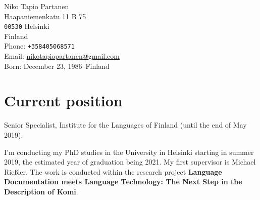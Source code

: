 \documentclass[11pt, a4paper]{article}
\begin{document}

\thispagestyle{empty}


{\LARGE Niko Tapio Partanen}\\[1cm] %
Haapaniemenkatu 11 B 75\\
\texttt{00530} Helsinki\\
Finland\\[.2cm]
Phone: \texttt{+358405068571}\\ %
Email: \href{mailto:nikotapiopartanen@gmail.com}{nikotapiopartanen@gmail.com}\\ %



Born: December 23, 1986–Finland\\ %


\section*{Current position}

Senior Specialist, Institute for the Languages of Finland (until the end of May 2019).

\vspace{3mm}

I'm conducting my PhD studies in the University in Helsinki starting in summer 2019, the estimated year of graduation being 2021. My first supervisor is Michael Rießler. The work is conducted within the research project \textbf{Language Documentation meets Language Technology: The Next Step in the Description of Komi}.

\end{document}
